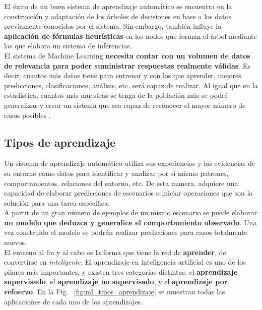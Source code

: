 El éxito de un buen sistema de aprendizaje automático se encuentra en la construcción y adaptación de los árboles de decisiones en base a los datos previamente conocidos por el sistema. Sin embargo, también influye la \textbf{aplicación de fórmulas heurísticas} en los nodos que forman el árbol mediante las que elabora un sistema de inferencias. \\

El sistema de Machine Learning \textbf{necesita contar con un volumen de datos de relevancia para poder suministrar respuestas realmente válidas}. Es decir, cuantos más datos tiene para entrenar y con los que aprender, mejores predicciones, clasificaciones, análisis, etc. será capaz de realizar. Al igual que en la estadística, cuantos más muestras se tenga de la población más se podrá generalizar y crear un sistema que sea capaz de reconocer el mayor número de casos posibles \cite{estadisticaDescriptiva, estadisticaGeneralizar, fernandez2002estadistica}. 

\subsection{Tipos de aprendizaje}

Un sistema de aprendizaje automático utiliza sus experiencias y las evidencias de su entorno como datos para identificar y analizar por sí mismo patrones, comportamientos, relaciones del entorno, etc. De esta manera, adquiere una capacidad de elaborar predicciones de escenarios o iniciar operaciones que son la solución para una tarea específica. \\

A partir de un gran número de ejemplos de un mismo escenario se puede elaborar \textbf{un modelo que deduzca y generalice el comportamiento observado}. Una vez construido el modelo se podrán realizar predicciones para casos totalmente nuevos. \\

El entreno al fin y al cabo es la forma que tiene la red de \textbf{aprender}, de convertirse en \textit{inteligente}. El aprendizaje en inteligencia artificial es uno de los pilares más importantes, y existen tres categorías distintas: el \textbf{aprendizaje supervisado}, el \textbf{aprendizaje no supervisado}, y el \textbf{aprendizaje por refuerzo}. En la Fig. ~\ref{fig:ml_tipos_aprendizaje} se muestran todas las aplicaciones de cada uno de los aprendizajes. 
 
